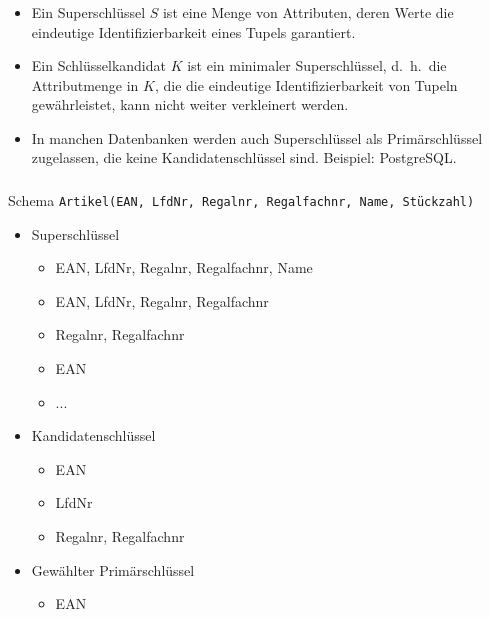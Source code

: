 \begin{frame}\frametitle{\insertsection}
\framesubtitle{\insertsubsection}
\onslide
{}
\begin{itemize}
\item Ein Superschlüssel $S$ ist eine Menge von Attributen, deren Werte die eindeutige Identifizierbarkeit eines Tupels 
garantiert.
\pause
\item Ein Schlüsselkandidat $K$ ist ein minimaler Superschlüssel, d.~h.~die Attributmenge in $K$, die die eindeutige 
Identifizierbarkeit von Tupeln gew\"ahrleistet, kann nicht weiter verkleinert werden.
\pause
\item In manchen Datenbanken werden auch Superschl\"ussel als Prim\"arschl\"ussel zugelassen, die keine Kandidatenschl\"ussel sind. 
Beispiel: PostgreSQL.
\end{itemize} 
\end{frame}

\begin{frame}\frametitle{\insertsection}
 \framesubtitle{\insertsubsection}
 \nl
 Schema \texttt{Artikel(EAN, LfdNr, Regalnr, Regalfachnr, Name, Stückzahl)}
	\begin{itemize}
		\item Superschlüssel
		\begin{itemize}
			\item {EAN, LfdNr, Regalnr, Regalfachnr, Name}
			\item {EAN, LfdNr, Regalnr, Regalfachnr}
			\item {Regalnr, Regalfachnr}
			\item {EAN}
			\item ...
		\end{itemize}
		\item Kandidatenschlüssel
		\begin{itemize}
			\item EAN
			\item LfdNr
                         \item {Regalnr, Regalfachnr}
		\end{itemize}
		\item{Gewählter Primärschlüssel}
		\begin{itemize}
			\item EAN
		\end{itemize}
	\end{itemize}
\end{frame}

